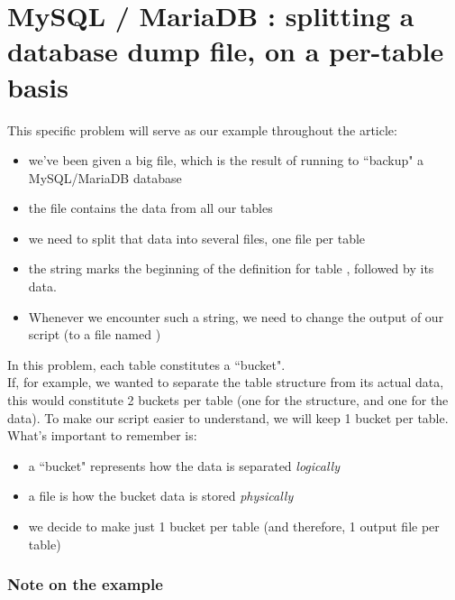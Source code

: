 
\renewcommand{\currentPart}{Splitting a MariaDB dump file, on a per-table basis}

\newpage
\part{MySQL / MariaDB : splitting a database dump file, on a per-table basis}

This specific problem will serve as our example throughout the article:

\begin{itemize}
	\item we've been given a big  file, which is the result of running \mysqldump to ``backup" a MySQL/MariaDB database
	\item the  file contains the data from all our tables
	\item we need to split that data into several  files, one file per table
	\item the string  marks the beginning of the definition for table , followed by its data. \
	\item Whenever we encounter such a string, we need to change the output of our script (to a file named )
\end{itemize}


In this problem, each table constitutes a ``bucket". \\

If, for example, we wanted to separate the table structure from its actual data, this would constitute 2 buckets per table (one for the structure, and one for the data). To make our script easier to understand, we will keep 1 bucket per table. \\

What's important to remember is:
\begin{itemize}
	\item a ``bucket" represents how the data is separated \emph{logically}
	\item a file is how the bucket data is stored \emph{physically}
	\item we decide to make just 1 bucket per table (and therefore, 1 output file per table)
\end{itemize}



\newpage

\section*{Note on the example}

